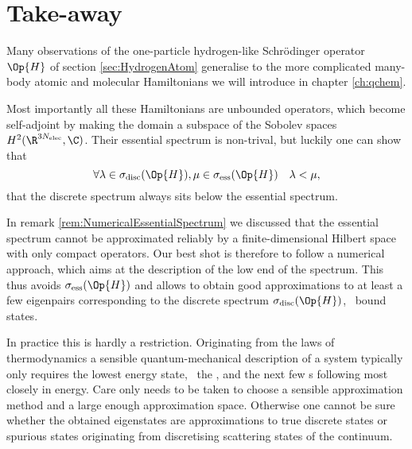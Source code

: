 \section{Take-away}
\label{sec:SpectralTakeAway}
Many observations of the one-particle hydrogen-like Schrödinger operator $\Op{H}$
of section \vref{sec:HydrogenAtom}
generalise to the more complicated many-body atomic and molecular Hamiltonians
we will introduce in chapter \vref{ch:qchem}.

Most importantly all these Hamiltonians are unbounded operators,
which become self-adjoint by making the domain
a subspace of the Sobolev spaces $H^2(\R^{3\Nelec}, \C)$.
Their essential spectrum is non-trival,
but luckily one can show~\cite{Zhislin1959,Zhislin1960,Reed1978,Teschl2014} that
\[ \forall \lambda \in \sigma_{\text{disc}}(\Op{H}),
	\mu \in \sigma_{\text{ess}}(\Op{H}) \quad \lambda < \mu, \]
\ie that the discrete spectrum always sits below the essential spectrum.

In remark \vref{rem:NumericalEssentialSpectrum} we discussed
that the essential spectrum cannot be approximated reliably
by a finite-dimensional Hilbert space with only compact operators.
Our best shot is therefore to follow a numerical approach,
which aims at the description of the low end of the spectrum.
This thus avoids $\sigma_{\text{ess}}(\Op{H})$
and allows to obtain good approximations to at least a few
eigenpairs corresponding to the discrete spectrum $\sigma_{\text{disc}}(\Op{H})$,
\ie~bound states.

In practice this is hardly a restriction.
Originating from the laws of thermodynamics
a sensible quantum-mechanical description of a system
typically only requires the lowest energy state,
\ie~the , and the next few s
following most closely in energy.
Care only needs to be taken to choose a sensible approximation
method and a large enough approximation space.
Otherwise one cannot be sure whether the obtained eigenstates
are approximations to true discrete states
or spurious states originating from discretising scattering states
of the continuum.
